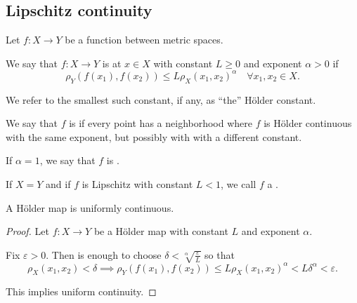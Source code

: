 \subsection{Lipschitz continuity}\label{subsec:lipschitz_continuity}

\begin{definition}\label{def:lipschitz_continuity}
  Let \( f: X \to Y \) be a function between metric spaces.

  \begin{defenum}
     We say that \( f: X \to Y \) is  at \( x \in X \) with constant \( L \geq 0 \) and exponent \( \alpha > 0 \) if
    \begin{equation*}
      \rho_Y(f(x_1), f(x_2)) \leq L \rho_X(x_1, x_2)^\alpha \quad\forall x_1, x_2 \in X.
    \end{equation*}

    We refer to the smallest such constant, if any, as \enquote{the} H\"older constant.

     We say that \( f \) is  if every point has a neighborhood where \( f \) is H\"older continuous with the same exponent, but possibly with with a different constant.

     If \( \alpha = 1 \), we say that \( f \) is .

     If \( X = Y \) and if \( f \) is Lipschitz with constant \( L < 1 \), we call \( f \) a .
  \end{defenum}
\end{definition}

\begin{proposition}\label{thm:holder_map_is_uniformly_continuous}
  A H\"older map is uniformly continuous.
\end{proposition}
\begin{proof}
  Let \( f: X \to Y \) be a H\"older map with constant \( L \) and exponent \( \alpha \).

  Fix \( \varepsilon > 0 \). Then is enough to choose \( \delta < \sqrt[\alpha]{\frac \varepsilon L} \) so that
  \begin{equation*}
    \rho_X(x_1, x_2) < \delta \implies \rho_Y(f(x_1), f(x_2)) \leq L \rho_X(x_1, x_2)^\alpha < L \delta^\alpha < \varepsilon.
  \end{equation*}

  This implies uniform continuity.
\end{proof}

